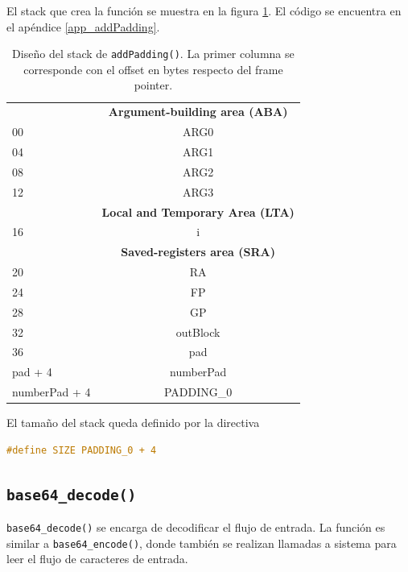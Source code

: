 El stack que crea la función se muestra en la figura \ref{stack_addPadding}. El código se encuentra en el apéndice \ref{app_addPadding}.

\begin{table}[H]
	\centering
	\begin{tabular}{@{}l|c|@{}}
		\cmidrule(l){2-2} 
		\multicolumn{1}{c|}{\textbf{}} & \textbf{Argument-building area (ABA)} \\ \cmidrule(l){2-2} 
		00 & ARG0 \\ \cmidrule(l){2-2} 
		04 & ARG1 \\ \cmidrule(l){2-2} 
		08 & ARG2 \\ \cmidrule(l){2-2}
		12 & ARG3 \\ \cmidrule(l){2-2} 
		\multicolumn{1}{c|}{\textbf{}} & \textbf{Local and Temporary Area (LTA)} \\ \cmidrule(l){2-2} 
		16 & i \\ \cmidrule(l){2-2} 
		\multicolumn{1}{c|}{\textbf{}} & \textbf{Saved-registers area (SRA)} \\ \cmidrule(l){2-2} 
		20 & RA \\ \cmidrule(l){2-2} 
		24 & FP \\ \cmidrule(l){2-2} 
		28 & GP \\ \cmidrule(l){2-2} 
		32 & outBlock \\ \cmidrule(l){2-2} 
	    36 & pad \\ \cmidrule(l){2-2} 
	    pad + 4 & numberPad \\ \cmidrule(l){2-2} 
	    numberPad + 4 & PADDING\_0 \\ \cmidrule(l){2-2} 
	\end{tabular}
	\caption{Diseño del stack de \texttt{addPadding()}. La primer columna se corresponde con el offset en bytes respecto del frame pointer.}
	\label{stack_addPadding}
\end{table}

El tamaño del stack queda definido por la directiva
\begin{lstlisting}[language=C, style=StyleC]
#define SIZE PADDING_0 + 4
\end{lstlisting}

\subsection{\texttt{base64\_decode()}}

\texttt{base64\_decode()} se encarga de decodificar el flujo de entrada. La función es similar a \texttt{base64\_encode()}, donde también se realizan llamadas a sistema para leer el flujo de caracteres de entrada.

